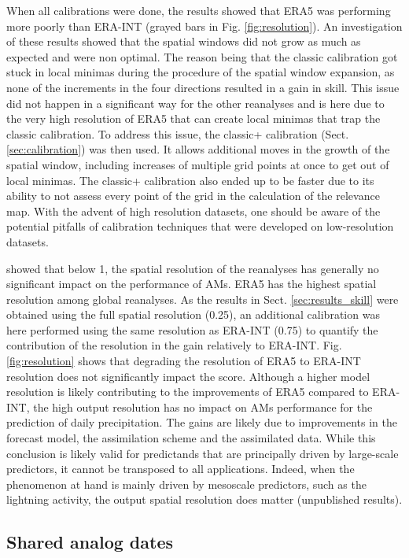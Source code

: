 \documentclass[alpha-refs]{wiley-article}
\begin{document}
When all calibrations were done, the results showed that ERA5 was performing more poorly than ERA-INT (grayed bars in Fig. \ref{fig:resolution}). An investigation of these results showed that the spatial windows did not grow as much as expected and were non optimal. The reason being that the classic calibration got stuck in local minimas during the procedure of the spatial window expansion, as none of the increments in the four directions resulted in a gain in skill. This issue did not happen in a significant way for the other reanalyses and is here due to the very high resolution of ERA5 that can create local minimas that trap the classic calibration. To address this issue, the classic+ calibration (Sect. \ref{sec:calibration}) was then used. It allows additional moves in the growth of the spatial window, including increases of multiple grid points at once to get out of local minimas. The classic+ calibration also ended up to be faster due to its ability to not assess every point of the grid in the calculation of the relevance map. With the advent of high resolution datasets, one should be aware of the potential pitfalls of calibration techniques that were developed on low-resolution datasets.

\citet{Horton2018b} showed that below 1\degree, the spatial resolution of the reanalyses has generally no significant impact on the performance of AMs. ERA5 has the highest spatial resolution among global reanalyses. As the results in Sect. \ref{sec:results_skill} were obtained using the full spatial resolution (0.25\degree), an additional calibration was here performed using the same resolution as ERA-INT (0.75\degree) to quantify the contribution of the resolution in the gain relatively to ERA-INT. Fig. \ref{fig:resolution} shows that degrading the resolution of ERA5 to ERA-INT resolution does not significantly impact the score. Although a higher model resolution is likely contributing to the improvements of ERA5 compared to ERA-INT, the high output resolution has no impact on AMs performance for the prediction of daily precipitation. The gains are likely due to improvements in the forecast model, the assimilation scheme and the assimilated data. While this conclusion is likely valid for predictands that are principally driven by large-scale predictors, it cannot be transposed to all applications. Indeed, when the phenomenon at hand is mainly driven by mesoscale predictors, such as the lightning activity, the output spatial resolution does matter (unpublished results).


\subsection{Shared analog dates}
\label{sec:results_shared_dates}
\end{document}
